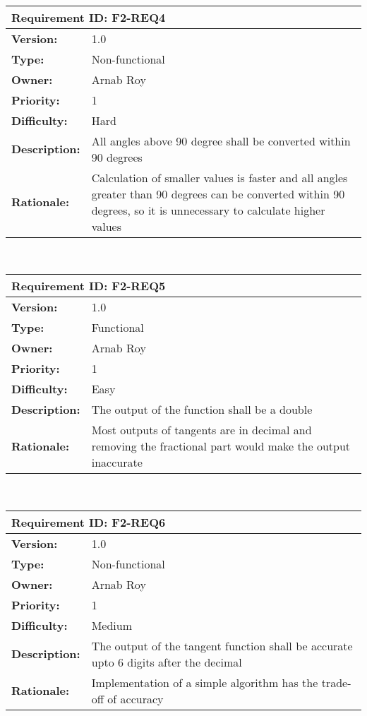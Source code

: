 \documentclass[12pt]{article}
\begin{document}
\\[10pt]
\begin{tabular}{ |p{4cm} | p{10cm}| }
 \hline
 \multicolumn{2}{|l|}{\textbf{Requirement ID: F2-REQ4}} \\
 \hline
 \textbf{Version:} & 1.0\\
 \textbf{Type:} & Non-functional\\
 \textbf{Owner:} & Arnab Roy\\
 \textbf{Priority:} & 1\\
 \textbf{Difficulty:} & Hard\\
 \textbf{Description:} & All angles above 90 degree shall be converted within 90 degrees\\
 \textbf{Rationale:} & Calculation of smaller values is faster and all angles greater than 90 degrees can be converted within 90 degrees, so it is unnecessary to calculate higher values\\
 \hline
\end{tabular}
\\[10pt]
\begin{tabular}{ |p{4cm} | p{10cm}| }
 \hline
 \multicolumn{2}{|l|}{\textbf{Requirement ID: F2-REQ5}} \\
 \hline
 \textbf{Version:} & 1.0\\
 \textbf{Type:} & Functional\\
 \textbf{Owner:} & Arnab Roy\\
 \textbf{Priority:} & 1\\
 \textbf{Difficulty:} & Easy\\
 \textbf{Description:} & The output of the function shall be a double\\
 \textbf{Rationale:} & Most outputs of tangents are in decimal and removing the fractional part would make the output inaccurate\\
 \hline
\end{tabular}
\\[10pt]
\begin{tabular}{ |p{4cm} | p{10cm}| }
 \hline
 \multicolumn{2}{|l|}{\textbf{Requirement ID: F2-REQ6}}\\
 \hline
 \textbf{Version:} & 1.0\\
 \textbf{Type:} & Non-functional\\
 \textbf{Owner:} & Arnab Roy\\
 \textbf{Priority:} & 1\\
 \textbf{Difficulty:} & Medium\\
 \textbf{Description:} & The output of the tangent function shall be accurate upto 6 digits after the decimal\\
 \textbf{Rationale:} & Implementation of a simple algorithm has the trade-off of accuracy\\
 \hline
\end{tabular}
\end{document}
